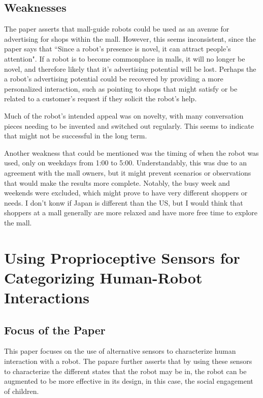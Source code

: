\documentclass{article}
\begin{document}
\subsection{Weaknesses}
The paper asserts that mall-guide robots could be used as an avenue for advertising for shops within the mall. However, this seems inconsistent, since the paper says that ``Since a robot's presence is novel, it can attract people's attention". If a robot is to become commonplace in malls, it will no longer be novel, and therefore likely that it's advertising potential will be lost. Perhaps the a robot's advertising potential could be recovered by providing a more personalized interaction, such as pointing to shops that might satisfy or be related to a customer's request if they solicit the robot's help.

Much of the robot's intended appeal was on novelty, with many conversation pieces needing to be invented and switched out regularly. This seems to indicate that might not be successful in the long term.

Another weakness that could be mentioned was the timing of when the robot was used, only on weekdays from 1:00 to 5:00. Understandably, this was due to an agreement with the mall owners, but it might prevent scenarios or observations that would make the results more complete. Notably, the busy week and weekends were excluded, which might prove to have very different shoppers or needs. I don't konw if Japan is different than the US, but I would think that shoppers at a mall generally are more relaxed and have more free time to explore the mall.

\section{Using Proprioceptive Sensors for Categorizing Human-Robot Interactions}

\subsection{Focus of the Paper}
This paper focuses on the use of alternative sensors to characterize human interaction with a robot. The papare further asserts that by using these sensors to characterize the different states that the robot may be in, the robot can be augmented to be more effective in its design, in this case, the social engagement of children.
\end{document}
